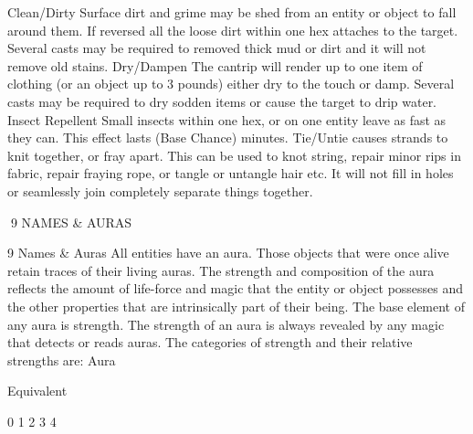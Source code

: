 \documentclass[a4paper]{article}
\begin{document}
\begin{multicols}{3}
Clean/Dirty Surface dirt and grime may be shed
from an entity or object to fall around them. If
reversed all the loose dirt within one hex attaches
to the target. Several casts may be required to
removed thick mud or dirt and it will not remove
old stains.
Dry/Dampen The cantrip will render up to one
item of clothing (or an object up to 3 pounds)
either dry to the touch or damp. Several casts may
be required to dry sodden items or cause the target
to drip water.
Insect Repellent Small insects within one hex, or
on one entity leave as fast as they can. This effect
lasts (Base Chance) minutes.
Tie/Untie causes strands to knit together, or fray
apart. This can be used to knot string, repair minor
rips in fabric, repair fraying rope, or tangle or
untangle hair etc. It will not fill in holes or seamlessly join completely separate things together.

9 NAMES & AURAS

9 Names & Auras
All entities have an aura. Those objects that were
once alive retain traces of their living auras. The
strength and composition of the aura reflects the
amount of life-force and magic that the entity or
object possesses and the other properties that are
intrinsically part of their being.
The base element of any aura is strength. The
strength of an aura is always revealed by any
magic that detects or reads auras. The categories of
strength and their relative strengths are:
Aura

Equivalent

0
1
2
3
4


\end{multicols}
\end{document}
